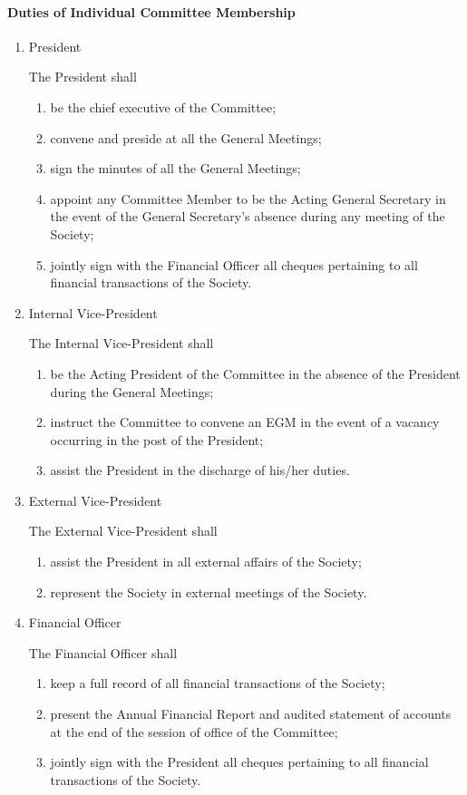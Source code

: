\documentclass[11pt,a4paper,notitlepage]{article}
\begin{document}
	\paragraph{Duties of Individual Committee Membership} 
	\begin{enumerate}
		\item President \par
		The President shall 
			\begin{enumerate}[label=\Alph*.]
				\item be the chief executive of the Committee; 
				\item convene and preside at all the General Meetings; 
				\item sign the minutes of all the General Meetings; 
				\item appoint any Committee Member to be the Acting General Secretary in the event of the General Secretary's absence during any meeting of the Society; 
				\item jointly sign with the Financial Officer all cheques pertaining to all financial transactions of the Society. 
			\end{enumerate}
		
		\item Internal Vice-President \par
		The Internal Vice-President shall 
			\begin{enumerate}[label=\Alph*.]
				\item be the Acting President of the Committee in the absence of the President during the General Meetings; 
				\item instruct the Committee to convene an EGM in the event of a vacancy occurring in the post of the President; 
				\item assist the President in the discharge of his/her duties. 
			\end{enumerate}
		
		\item External Vice-President \par
		The External Vice-President shall 
			\begin{enumerate}[label=\Alph*.]
				\item assist the President in all external affairs of the Society; 
				\item represent the Society in external meetings of the Society. 
			\end{enumerate}
		
		\item Financial Officer \par
		The Financial Officer shall 
			\begin{enumerate}[label=\Alph*.]
				\item keep a full record of all financial transactions of the Society; 
				\item present the Annual Financial Report and audited statement of accounts at the end of the session of office of the Committee; 
				\item jointly sign with the President all cheques pertaining to all financial transactions of the Society. 
			\end{enumerate}
		

\end{enumerate}
\end{document}

